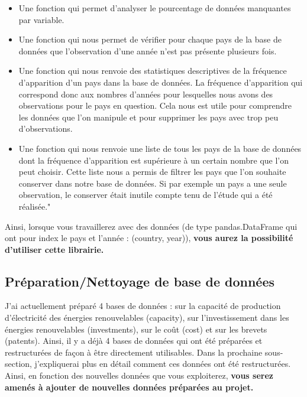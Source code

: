 \documentclass[12pt]{article}
\begin{document}
\begin{itemize}
    \renewcommand{\labelitemi}{-} %
    \item Une fonction qui permet d'analyser le pourcentage de données manquantes par variable.
    \item Une fonction qui nous permet de vérifier pour chaque pays de la base de données que 
    l'observation d’une année n'est pas présente plusieurs fois.
    \item Une fonction qui nous renvoie des statistiques descriptives de la fréquence 
    d'apparition d'un pays dans la base de données. La fréquence d'apparition qui correspond 
    donc aux nombres d'années pour lesquelles nous avons des observations pour le pays en question. 
    Cela nous est utile pour comprendre les données que l'on manipule et pour supprimer les pays 
    avec trop peu d'observations.
    \item Une fonction qui nous renvoie une liste de tous les pays de la base de données dont 
    la fréquence d'apparition est supérieure à un certain nombre que l'on peut choisir. 
    Cette liste nous a permis de filtrer les pays que l'on souhaite conserver dans notre base de données. 
    Si par exemple un pays a une seule observation, le conserver était inutile compte 
    tenu de l'étude qui a été réalisée."\cite{memoir}
\end{itemize}

Ainsi, lorsque vous travaillerez avec des données (de type pandas.DataFrame qui ont pour index le pays et l'année : (country, year)), 
\textbf{vous aurez la possibilité d'utiliser cette librairie.}

\subsection{Préparation/Nettoyage de base de données }

J'ai actuellement préparé 4 bases de données : sur la capacité de production d'électricité des 
énergies renouvelables (capacity), sur l'investissement dans les énergies renouvelables (investments), 
sur le coût (cost) et sur les brevets (patents). Ainsi, il y a déjà 4 bases de données qui ont été 
préparées et restructurées de façon à être directement utilisables. Dans la prochaine sous-section, 
j'expliquerai plus en détail comment ces données ont été restructurées. Ainsi, en fonction des 
nouvelles données que vous exploiterez, \textbf{vous serez amenés à ajouter de nouvelles données préparées au projet.}
\end{document}
